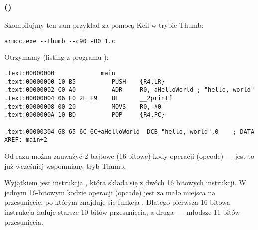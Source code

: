 \subsubsection{\NonOptimizingKeilVI (\ThumbMode)}

Skompilujmy ten sam przykład za pomocą Keil w trybie
 Thumb:

\begin{lstlisting}
armcc.exe --thumb --c90 -O0 1.c 
\end{lstlisting}

Otrzymamy (listing z programu \IDA):

\begin{lstlisting}[caption=\NonOptimizingKeilVI (\ThumbMode) + \IDA,style=customasmARM]
.text:00000000             main
.text:00000000 10 B5          PUSH    {R4,LR}
.text:00000002 C0 A0          ADR     R0, aHelloWorld ; "hello, world"
.text:00000004 06 F0 2E F9    BL      __2printf
.text:00000008 00 20          MOVS    R0, #0
.text:0000000A 10 BD          POP     {R4,PC}

.text:00000304 68 65 6C 6C+aHelloWorld  DCB "hello, world",0    ; DATA XREF: main+2
\end{lstlisting}

Od razu można zauważyć 2 bajtowe (16-bitowe) kody operacji (opcode) --- jest to już wcześniej wspomniany tryb Thumb.

Wyjątkiem jest instrukcja , która składa się z dwóch 16 bitowych instrukcji.
W jednym 16-bitowym kodzie operacji (opcode) jest za mało miejsca na przesunięcie, po którym znajduje się funkcja \printf.
Dlatego pierwsza 16 bitowa instrukcja ładuje starsze 10 bitów przesunięcia, a druga~--- młodsze 11 bitów przesunięcia.


